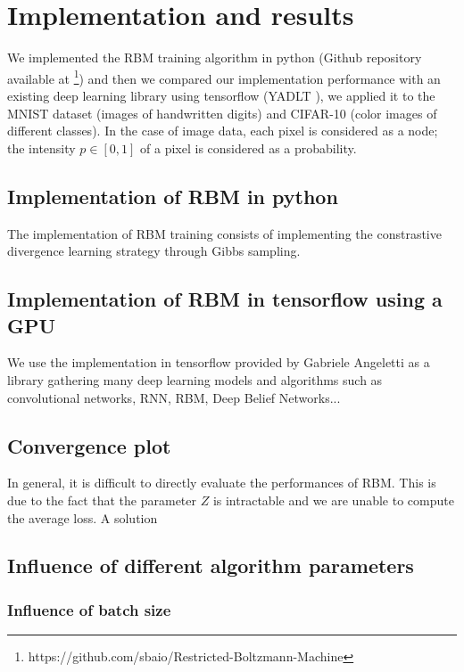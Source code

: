 \documentclass{article}
\begin{document}
\clearpage
\section{Implementation and results}

We implemented the RBM training algorithm in python (Github repository available at \footnote{https://github.com/sbaio/Restricted-Boltzmann-Machine}) and then we compared our implementation performance with an existing deep learning library using tensorflow (YADLT \cite{yadltGithub}), we applied it to the MNIST dataset (images of handwritten digits) and CIFAR-10 (color images of different classes). In the case of image data, each pixel is considered as a node; the intensity $p \in [0,1]$ of a pixel is considered as a probability. \\

\subsection{Implementation of RBM in python}

The implementation of RBM training consists of implementing the constrastive divergence learning strategy through Gibbs sampling.


\subsection{Implementation of RBM in tensorflow using a GPU}

We use the implementation in tensorflow provided by Gabriele Angeletti as a library gathering many deep learning models and algorithms such as convolutional networks, RNN, RBM, Deep Belief Networks...

\subsection{Convergence plot}

In general, it is difficult to directly evaluate the performances of RBM. This is due to the fact that the parameter $Z$ is intractable and we are unable to compute the average loss. A solution 

\subsection{Influence of different algorithm parameters}

\subsubsection{Influence of batch size}
\end{document}
